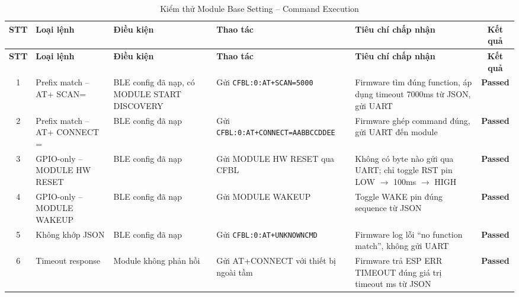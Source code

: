         \begin{longtable}{|c|p{2cm}|p{2.5cm}|p{3.5cm}|p{4cm}|c|}
            \caption{Kiểm thử Module Base Setting -- Command Execution}
            \label{tab:test_module_base_command} \\
            \hline
            \textbf{STT} & \textbf{Loại lệnh} & \textbf{Điều kiện} & \textbf{Thao tác} & \textbf{Tiêu chí chấp nhận} & \textbf{Kết quả} \\ \hline
            \endfirsthead
            \hline
            \textbf{STT} & \textbf{Loại lệnh} & \textbf{Điều kiện} & \textbf{Thao tác} & \textbf{Tiêu chí chấp nhận} & \textbf{Kết quả} \\ \hline
            \endhead
            \hline
            \endfoot
            \endlastfoot

            1 & Prefix match -- AT+ \newline SCAN= & BLE config đã nạp, có MODULE START DISCOVERY & Gửi \texttt{CFBL:0:}\newline\texttt{AT+SCAN=5000} & Firmware tìm đúng function, áp dụng timeout 7000ms từ JSON, gửi UART & \textcolor{modern_blue}{\textbf{Passed}} \\ \hline
            2 & Prefix match -- AT+ \newline CONNECT \newline = & BLE config đã nạp & Gửi \texttt{CFBL:0:}\newline\texttt{AT+CONNECT=}\newline\texttt{AABBCCDDEE} & Firmware ghép command đúng, gửi UART đến module & \textcolor{modern_blue}{\textbf{Passed}} \\ \hline
            3 & GPIO-only -- MODULE HW RESET & BLE config đã nạp & Gửi MODULE HW RESET qua CFBL & Không có byte nào gửi qua UART; chỉ toggle RST pin LOW $\rightarrow$ 100ms $\rightarrow$ HIGH & \textcolor{modern_blue}{\textbf{Passed}} \\ \hline
            4 & GPIO-only -- MODULE WAKEUP & BLE config đã nạp & Gửi MODULE WAKEUP & Toggle WAKE pin đúng sequence từ JSON & \textcolor{modern_blue}{\textbf{Passed}} \\ \hline
            5 & Không khớp JSON & BLE config đã nạp & Gửi \texttt{CFBL:0:}\newline\texttt{AT+UNKNOWNCMD} & Firmware log lỗi ``no function match'', không gửi UART & \textcolor{modern_blue}{\textbf{Passed}} \\ \hline
            6 & Timeout response & Module không phản hồi & Gửi AT+CONNECT với thiết bị ngoài tầm & Firmware trả ESP ERR TIMEOUT đúng giá trị timeout ms từ JSON & \textcolor{modern_blue}{\textbf{Passed}} \\ \hline
        \end{longtable}

